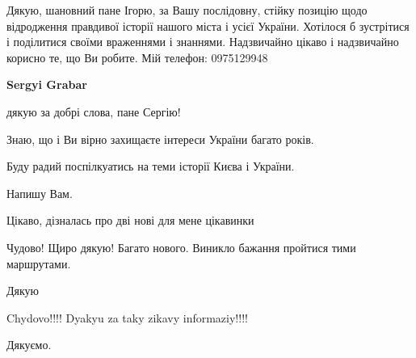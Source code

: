 \begin{itemize}

Дякую, шановний пане Ігорю, за Вашу послідовну, стійку позицію щодо відродження
правдивої історії нашого міста і усієї України. Хотілося б зустрітися і
поділитися своїми враженнями і знаннями. Надзвичайно цікаво і надзвичайно
корисно те, що Ви робите. Мій телефон: 0975129948

\textbf{Sergyi Grabar} 

дякую за добрі слова, пане Сергію!

Знаю, що і Ви вірно захищаєте інтереси України багато років.

Буду радий поспілкуатись на теми історії Києва і України.

Напишу Вам.

Цікаво, дізналась про дві нові для мене цікавинки

Чудово! Щиро дякую! Багато нового. Виникло бажання пройтися тими маршрутами.

Дякую

Chydovo!!!! Dyakyu za taky zikavy informaziy!!!!

Дякуємо.

\end{itemize} %
